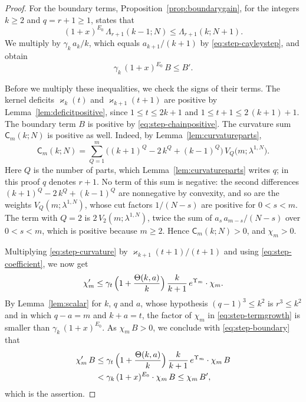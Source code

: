 \documentclass{amsart}
\theoremstyle{definition}
\theoremstyle{remark}
\numberwithin{equation}{section}
\begin{document}
\begin{proof}
For the boundary terms, Proposition~\ref{prop:boundarygain}, for the
integers $k\ge2$ and $q=r+1\ge1$, states that
\[
(1+x)^{E_0}\,\Lambda_{r+1}(k-1;N)\le\Lambda_{r+1}(k;N+1).
\]
We multiply by $\gamma_k\,a_k/k$, which equals $a_{k+1}/(k+1)$ by
\eqref{eq:step-cayleystep}, and obtain
\begin{equation}\label{eq:step-boundary}
\gamma_k\,(1+x)^{E_0}\,B\le B' .
\end{equation}

Before we multiply these inequalities, we check the signs of their terms.
The kernel deficits $\varkappa_k(t)$ and
$\varkappa_{k+1}(t+1)$ are positive by Lemma~\ref{lem:deficitpositive},
since $1\le t\le2k+1$ and $1\le t+1\le2\,(k+1)+1$. The boundary term $B$ is
positive by \eqref{eq:step-chainpositive}. The curvature sum
$\mathsf C_m(k;N)$ is positive as well. Indeed, by
Lemma~\ref{lem:curvatureparts},
\[
\mathsf C_m(k;N)=\sum_{Q=1}^{m}\bigl((k+1)^Q-2\,k^Q+(k-1)^Q\bigr)\,
V_Q\bigl(m;\lambda^{1,N}\bigr).
\]
Here $Q$ is the number of parts, which Lemma~\ref{lem:curvatureparts} writes
$q$; in this proof $q$ denotes $r+1$.
No term of this sum is negative: the second differences
$(k+1)^Q-2\,k^Q+(k-1)^Q$ are nonnegative by convexity, and so are the
weights $V_Q(m;\lambda^{1,N})$, whose cut factors $1/(N-s)$ are positive for
$0<s<m$. The term with $Q=2$ is $2\,V_2(m;\lambda^{1,N})$, twice the sum of
$a_s\,a_{m-s}/(N-s)$ over $0<s<m$, which is positive because
$m\ge2$. Hence $\mathsf C_m(k;N)>0$, and $\chi_m>0$.

Multiplying \eqref{eq:step-curvature} by
$\varkappa_{k+1}(t+1)/(t+1)$ and using \eqref{eq:step-coefficient}, we now
get
\begin{equation}\label{eq:step-termgrowth}
\chi'_m\le\gamma_t\,\Bigl(1+\frac{\Theta(k,a)}{k}\Bigr)\,\frac{k}{k+1}\,
e^{\Upsilon_m}\cdot\chi_m .
\end{equation}
By Lemma~\ref{lem:scalar} for $k$, $q$ and $a$, whose hypothesis
$(q-1)^3\le k^2$ is $r^3\le k^2$ and in which $q-a=m$ and $k+a=t$, the
factor of $\chi_m$ in \eqref{eq:step-termgrowth} is smaller than
$\gamma_k\,(1+x)^{E_0}$. As $\chi_m\,B>0$, we conclude with
\eqref{eq:step-boundary} that
\begin{align*}
\chi'_m\,B&\le\gamma_t\,\Bigl(1+\frac{\Theta(k,a)}{k}\Bigr)\,\frac{k}{k+1}\,
e^{\Upsilon_m}\cdot\chi_m\,B\\
&<\gamma_k\,(1+x)^{E_0}\cdot\chi_m\,B\le\chi_m\,B' ,
\end{align*}
which is the assertion.
\end{proof}
\end{document}
